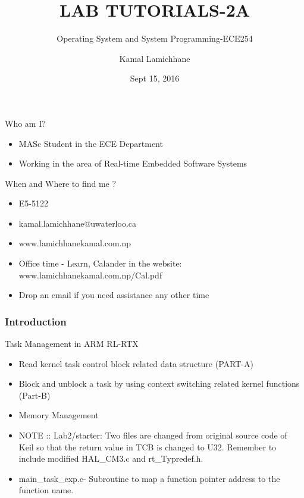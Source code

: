 \documentclass[serif,mathserif]{beamer}
\author[Kamal Lamichhane]{Kamal Lamichhane }
\title[ECE-254, Lab 2A\hspace{2em}\insertframenumber/\inserttotalframenumber]{LAB TUTORIALS-2A}
\subtitle[] {Operating System and System Programming-ECE254}
\date{Sept 15, 2016} %
\institute{Electrical and Computer Engineering, University of Waterloo, University of Waterloo}
\begin{document}
\maketitle


\begin{frame}{Who am I? }
\begin{itemize}
    \item MASc Student in the ECE Department
    \item Working in the area of Real-time Embedded Software Systems
    \end{itemize}
 \end{frame}
 
 \begin{frame} {When and Where to find me ?}
 \begin{itemize}
     \item E5-5122 
     \item kamal.lamichhane@uwaterloo.ca 
     \item www.lamichhanekamal.com.np \pause
     \item Office time - Learn, Calander in the website: www.lamichhanekamal.com.np/Cal.pdf \pause
     \item Drop an email if you need assistance any other time
     
 \end{itemize}
 
  \end{frame}

\begin{frame}
  \frametitle{Introduction}
  Task Management in ARM RL-RTX\pause
  \begin{itemize}
  \item Read kernel task control block related data structure (PART-A)\pause
  \item Block and unblock a task by using context switching related kernel functions (Part-B)\pause
  \item Memory Management \pause %
  \item NOTE :: Lab2/starter: Two files are changed from original source code of Keil so that the return value in TCB is changed to U32. Remember to include modified HAL\_CM3.c and rt\_Typredef.h. \pause
  \item main\_task\_exp.c- Subroutine to map a function pointer address to the function name.
  \end{itemize}
\end{frame}
\end{document}
